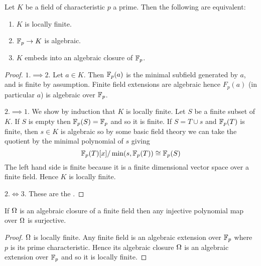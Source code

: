 \begin{lem}
    Let $K$ be a field of characteristic $p$ a prime.
    Then the following are equivalent:
    \begin{enumerate}
        \item $K$ is locally finite.
        \item $\mathbb{F}_p \to K$ is algebraic.
        \item $K$ embeds into an algebraic closure of $\mathbb{F}_p$.
    \end{enumerate}
\end{lem}
\begin{proof}
  $1.\implies 2.$
  Let $a \in K$. Then $\mathbb{F}_{p}(a)$ is the minimal subfield generated by $a$,
  and is finite by assumption.
  Finite field extensions are algebraic hence $F_{p}(a)$
  (in particular $a$) is algebraic over $\mathbb{F}_{p}$.

  $2. \implies 1.$ We show by induction that $K$ is locally
  finite.
  Let $S$ be a finite subset of $K$.
  If $S$ is empty then $\mathbb{F}_p(S) = \mathbb{F}_p$ and so it is finite.
  If $S = T \cup {s}$ and $\mathbb{F}_p(T)$ is finite,
  then $s \in K$ is algebraic so by some basic field theory we can
  take the quotient by the minimal polynomial of $s$ giving
  \[\mathbb{F}_p(T)[x] / \min (s, \mathbb{F}_p(T)) \cong \mathbb{F}_p(S)\]
  The left hand side is finite because it is a finite
  dimensional vector space over a finite field.
  Hence $K$ is locally finite.

  $2. \iff 3.$ These are the
  .
\end{proof}

\begin{cor}
    If $\Omega$ is an algebraic closure of a finite field
    then any injective polynomial map over $\Omega$ is surjective.
\end{cor}
\begin{proof}
   $\Omega$ is locally finite.
  Any finite field is an algebraic extension over $\mathbb{F}_p$ where $p$ is its
  prime characteristic.
  Hence its algebraic closure $\Omega$ is an algebraic extension over $\mathbb{F}_p$ and so
  it is locally finite.
\end{proof}
